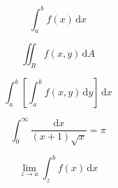 \documentclass[preview, border=1pt, varwidth]{standalone}
\begin{document}
\[
\displaystyle\int_{a}^{b} f(x) \,\mathrm{d}x
\]

\[
\displaystyle\iint_{R} f(x,y) \,\mathrm{d}A
\]

\[
\displaystyle\int_{a}^{b} \left[ \int_{a}^{b} f(x,y) \,\mathrm{d}y \right] \,\mathrm{d}x
\]

\[
\displaystyle\int_{0}^{\infty} \frac{\mathrm{d}x}{(x+1) \sqrt{x}} = \pi
\]

\[
\displaystyle\lim_{z\to a} \int_{z}^{b} f(x) \,\mathrm{d}x
\]
\end{document}
